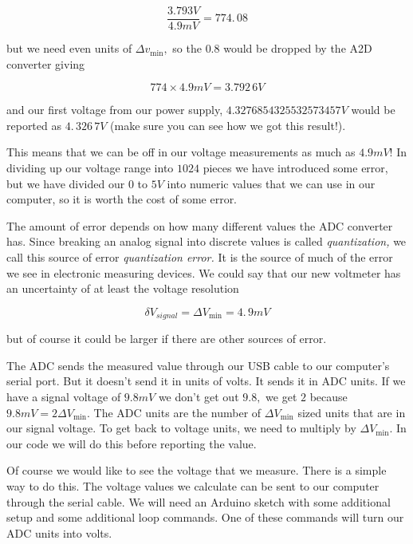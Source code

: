 \begin{equation*}
	\frac{3.793\unit{V}}{4.9\unit{mV}}=774.\,\allowbreak 08
\end{equation*}

but we need even units of $\Delta v_{\min },$ so the $0.8$ would be dropped by the A2D converter giving 

\begin{equation*}
	774\times 4.9\unit{mV}=\allowbreak 3.792\,\allowbreak 6\unit{V}
\end{equation*}

and our first voltage from our power supply, $4.3276854325532573457\unit{V}$
would be reported as $4.\,\allowbreak 326\,7\unit{V}$ (make sure you can see
how we got this result!).

This means that we can be off in our voltage measurements as much as $4.9%
\unit{mV}$! In dividing up our voltage range into $1024$ pieces we have
introduced some error, but we have divided our $0$ to $5\unit{V}$ into
numeric values that we can use in our computer, so it is worth the cost of
some error.

The amount of error depends on how many different values the ADC converter
has. Since breaking an analog signal into discrete values is called \emph{
quantization, }we call this source of error \emph{quantization error.} It is
the source of much of the error we see in electronic measuring devices. We
could say that our new voltmeter has an uncertainty of at least the voltage
resolution

\begin{equation*}
	\delta V_{signal}=\Delta V_{\min }=4.\,\allowbreak 9\unit{mV}
\end{equation*}

but of course it could be larger if there are other sources of error.

The ADC sends the measured value through our USB cable to our computer's
serial port. But it doesn't send it in units of volts. It sends it in ADC
units. If we have a signal voltage of $9.8\unit{mV}$ we don't get out $9.8,$
we get $2$ because $9.8\unit{mV}=2\Delta V_{\min }.$ The ADC units are the
number of $\Delta V_{\min }$ sized units that are in our signal voltage. To
get back to voltage units, we need to multiply by $\Delta V_{\min }.$ In our
code we will do this before reporting the value.

Of course we would like to see the voltage that we measure. There is a
simple way to do this. The voltage values we calculate can be sent to our
computer through the serial cable. We will need an Arduino sketch with some
additional setup and some additional loop commands. One of these commands
will turn our ADC units into volts.

